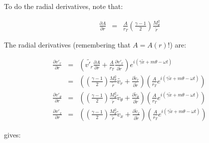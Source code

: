 \documentclass[12pt]{article}
\begin{document}
To do the radial derivatives, note that:

\begin{eqnarray}
\frac{\partial A}{\partial r}
&=&
\frac{A}{r_T} 
\left(\frac{\gamma-1}{2} \right) \frac{M^2_{\theta}}{\widetilde{r}}
\nonumber
\end{eqnarray}

The radial derivatives (remembering that $A = A\left(r \right)$!) are:

\begin{eqnarray}
\frac{\partial v'_r}{\partial r}
&=&
\left(
\widetilde{v'_r}
\frac{\partial A}{\partial r}
+
\frac{A}{r_T}
\frac{\partial v'_r}{\partial \widetilde{r}} 
\right)
e^{i \left(\overline{\gamma} \widetilde{x} + m \theta - \omega t \right)}
\nonumber
\\
&=&
\left(
\left(\frac{\gamma-1}{2} \right)
\frac{M_{\theta}^2}{\widetilde{r}}
\widetilde{v_r}
+
\frac{\partial \widetilde{v}_r}{\partial \widetilde{r}} 
\right)
\left(
\frac{A}{r_T}
e^{i \left(\overline{\gamma} \widetilde{x} + m \theta - \omega t \right)}
\right)
\nonumber
\\
\frac{\partial v'_{\theta}}{\partial r}
&=&
\left(
\left(\frac{\gamma-1}{2} \right)
\frac{M_{\theta}^2}{\widetilde{r}}
\widetilde{v}_{\theta}
+
\frac{\partial \widetilde{v}_{\theta}}{\partial \widetilde{r}} 
\right)
\left(
\frac{A}{r_T}
e^{i \left(\overline{\gamma} \widetilde{x} + m \theta - \omega t \right)}
\right)
\nonumber
\\
\frac{\partial v'_x}{\partial r}
&=&
\left(
\left(\frac{\gamma-1}{2} \right)
\frac{M_{\theta}^2}{\widetilde{r}}
\widetilde{v}_x
+
\frac{\partial \widetilde{v}_x}{\partial \widetilde{r}} 
\right)
\left(
\frac{A}{r_T}
e^{i \left(\overline{\gamma} \widetilde{x} + m \theta - \omega t \right)}
\right)
\nonumber
\end{eqnarray}

gives:
\end{document}
